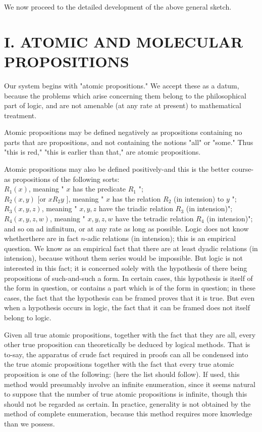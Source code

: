 \documentclass[10pt]{article}
\begin{document}
We now proceed to the detailed development of the above general sketch.

\section*{I. ATOMIC AND MOLECULAR PROPOSITIONS}
Our system begins with "atomic propositions." We accept these as a datum, because the problems which arise concerning them belong to the philosophical part of logic, and are not amenable (at any rate at present) to mathematical treatment.

Atomic propositions may be defined negatively as propositions containing no parts that are propositions, and not containing the notions "all" or "some." Thus "this is red," "this is earlier than that," are atomic propositions.

Atomic propositions may also be defined positively-and this is the better course-as propositions of the following sorts:\\
$R_{1}(x)$, meaning " $x$ has the predicate $R_{1}$ ";\\
$R_{2}(x, y)$ [or $x R_{2} y$ ], meaning " $x$ has the relation $R_{2}$ (in intension) to $y$ ";\\
$R_{3}(x, y, z)$, meaning " $x, y, z$ have the triadic relation $R_{3}$ (in intension)";\\
$R_{4}(x, y, z, w)$, meaning " $x, y, z, w$ have the tetradic relation $R_{4}$ (in intension)"; and so on ad infinitum, or at any rate as long as possible. Logic does not know whetherthere are in fact $n$-adic relations (in intension); this is an empirical question. We know as an empirical fact that there are at least dyadic relations (in intension), because without them series would be impossible. But logic is not interested in this fact; it is concerned solely with the hypothesis of there being propositions of such-and-such a form. In certain cases, this hypothesis is itself of the form in question, or contains a part which is of the form in question; in these cases, the fact that the hypothesis can be framed proves that it is true. But even when a hypothesis occurs in logic, the fact that it can be framed does not itself belong to logic.

Given all true atomic propositions, together with the fact that they are all, every other true proposition can theoretically be deduced by logical methods. That is to-say, the apparatus of crude fact required in proofs can all be condensed into the true atomic propositions together with the fact that every true atomic proposition is one of the following: (here the list should follow). If used, this method would presumably involve an infinite enumeration, since it seems natural to suppose that the number of true atomic propositions is infinite, though this should not be regarded as certain. In practice, generality is not obtained by the method of complete enumeration, because this method requires more knowledge than we possess.
\end{document}
